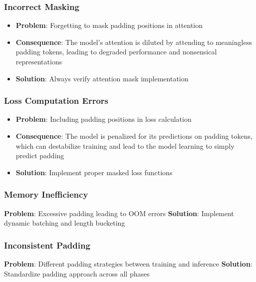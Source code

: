 \subsubsection{Incorrect Masking}
\begin{itemize}
\item \textbf{Problem}: Forgetting to mask padding positions in attention
\item \textbf{Consequence}: The model's attention is diluted by attending to meaningless padding tokens, leading to degraded performance and nonsensical representations
\item \textbf{Solution}: Always verify attention mask implementation
\end{itemize}

\subsubsection{Loss Computation Errors}
\begin{itemize}
\item \textbf{Problem}: Including padding positions in loss calculation
\item \textbf{Consequence}: The model is penalized for its predictions on padding tokens, which can destabilize training and lead to the model learning to simply predict padding
\item \textbf{Solution}: Implement proper masked loss functions
\end{itemize}

\subsubsection{Memory Inefficiency}
\textbf{Problem}: Excessive padding leading to OOM errors
\textbf{Solution}: Implement dynamic batching and length bucketing

\subsubsection{Inconsistent Padding}
\textbf{Problem}: Different padding strategies between training and inference
\textbf{Solution}: Standardize padding approach across all phases

